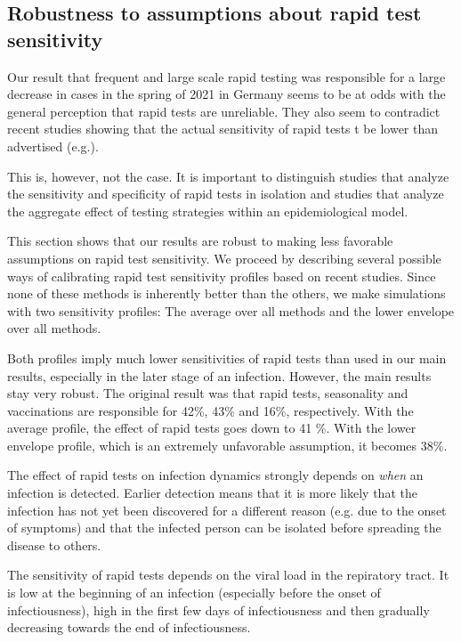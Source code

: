 \subsection{Robustness to assumptions about rapid test sensitivity}
\label{subsec:robustness_rapid_test_sensitivity}


Our result that frequent and large scale rapid testing was responsible for a
large decrease in cases in the spring of 2021 in Germany seems to be at odds
with the general perception that rapid tests are unreliable. They also seem to
contradict recent studies showing that the actual sensitivity of rapid tests t
be lower than advertised (e.g.\cite{Scheiblauer2021}).

This is, however, not the case. It is important to distinguish studies that
analyze the sensitivity and specificity of rapid tests in isolation and studies
that analyze the aggregate effect of testing strategies within an
epidemiological model.

This section shows that our results are robust to making less favorable
assumptions on rapid test sensitivity. We proceed by describing several possible
ways of calibrating rapid test sensitivity profiles based on recent studies.
Since none of these methods is inherently better than the others, we make
simulations with two sensitivity profiles: The average over all methods and the
lower envelope over all methods.

Both profiles imply much lower sensitivities of rapid tests than used in our
main results, especially in the later stage of an infection. However, the main
results stay very robust. The original result was that rapid tests, seasonality
and vaccinations are responsible for 42\%, 43\% and 16\%, respectively. With the
average profile, the effect of rapid tests goes down to 41 \%. With the lower
envelope profile, which is an extremely unfavorable assumption, it becomes 38\%.


The effect of rapid tests on infection dynamics strongly depends on \emph{when}
an infection is detected. Earlier detection means that it is more likely that
the infection has not yet been discovered for a different reason (e.g. due to
the onset of symptoms) and that the infected person can be isolated before
spreading the disease to others.

The sensitivity of rapid tests depends on the viral load in the repiratory
tract. It is low at the beginning of an infection (especially before the onset
of infectiousness), high in the first few days of infectiousness and then
gradually decreasing towards the end of infectiousness.

